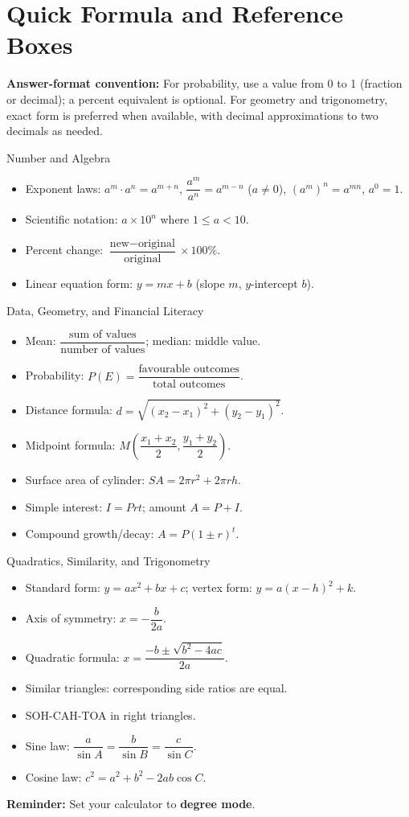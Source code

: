 \documentclass[12pt,oneside]{article}
\newcommand{\degmode}{\textbf{Reminder:} Set your calculator to \textbf{degree mode}.}
\begin{document}

\section{Quick Formula and Reference Boxes}
\textbf{Answer-format convention:} For probability, use a value from 0 to 1 (fraction or decimal); a percent equivalent is optional. For geometry and trigonometry, exact form is preferred when available, with decimal approximations to two decimals as needed.

\begin{refbox}{Number and Algebra}
\begin{itemize}
  \item Exponent laws: $a^m\cdot a^n=a^{m+n}$, $\dfrac{a^m}{a^n}=a^{m-n}$ ($a\neq 0$), $(a^m)^n=a^{mn}$, $a^0=1$.
  \item Scientific notation: $a\times10^n$ where $1\le a<10$.
  \item Percent change: $\dfrac{\text{new}-\text{original}}{\text{original}}\times 100\%$.
  \item Linear equation form: $y=mx+b$ (slope $m$, $y$-intercept $b$).
\end{itemize}
\end{refbox}

\begin{refbox}{Data, Geometry, and Financial Literacy}
\begin{itemize}
  \item Mean: $\dfrac{\text{sum of values}}{\text{number of values}}$; median: middle value.
  \item Probability: $P(E)=\dfrac{\text{favourable outcomes}}{\text{total outcomes}}$.
  \item Distance formula: $d=\sqrt{(x_2-x_1)^2+(y_2-y_1)^2}$.
  \item Midpoint formula: $M\left(\dfrac{x_1+x_2}{2},\dfrac{y_1+y_2}{2}\right)$.
  \item Surface area of cylinder: $SA=2\pi r^2+2\pi rh$.
  \item Simple interest: $I=Prt$; amount $A=P+I$.
  \item Compound growth/decay: $A=P(1\pm r)^t$.
\end{itemize}
\end{refbox}

\begin{refbox}{Quadratics, Similarity, and Trigonometry}
\begin{itemize}
  \item Standard form: $y=ax^2+bx+c$; vertex form: $y=a(x-h)^2+k$.
  \item Axis of symmetry: $x=-\dfrac{b}{2a}$.
  \item Quadratic formula: $x=\dfrac{-b\pm\sqrt{b^2-4ac}}{2a}$.
  \item Similar triangles: corresponding side ratios are equal.
  \item SOH-CAH-TOA in right triangles.
  \item Sine law: $\dfrac{a}{\sin A}=\dfrac{b}{\sin B}=\dfrac{c}{\sin C}$.
  \item Cosine law: $c^2=a^2+b^2-2ab\cos C$.
\end{itemize}
\degmode
\end{refbox}
\end{document}
